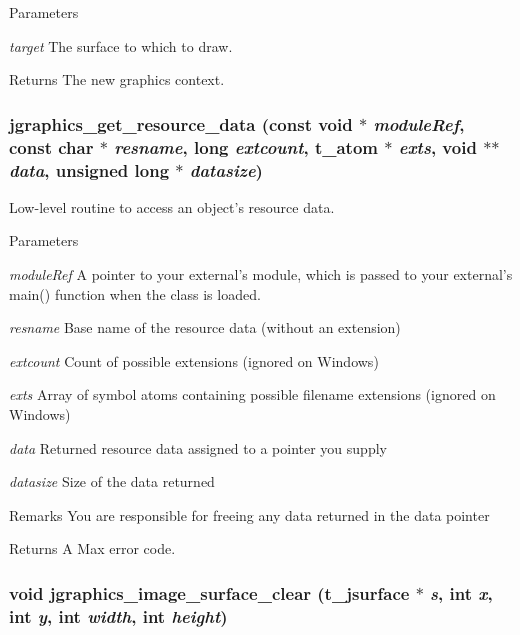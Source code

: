 \begin{DoxyParams}{Parameters}
\item[{\em target}]The surface to which to draw. \end{DoxyParams}
\begin{DoxyReturn}{Returns}
The new graphics context. 
\end{DoxyReturn}
\hypertarget{group__jsurface_gacdc136f6f6a54c8a8a825ba5cb708683}{
\subsubsection[{jgraphics\_\-get\_\-resource\_\-data}]{ jgraphics\_\-get\_\-resource\_\-data (const void $\ast$ {\em moduleRef}, \/  const char $\ast$ {\em resname}, \/  long {\em extcount}, \/  {\bf t\_\-atom} $\ast$ {\em exts}, \/  void $\ast$$\ast$ {\em data}, \/  unsigned long $\ast$ {\em datasize})}}
\label{group__jsurface_gacdc136f6f6a54c8a8a825ba5cb708683}


Low-\/level routine to access an object's resource data. 
\begin{DoxyParams}{Parameters}
\item[{\em moduleRef}]A pointer to your external's module, which is passed to your external's main() function when the class is loaded. \item[{\em resname}]Base name of the resource data (without an extension) \item[{\em extcount}]Count of possible extensions (ignored on Windows) \item[{\em exts}]Array of symbol atoms containing possible filename extensions (ignored on Windows) \item[{\em data}]Returned resource data assigned to a pointer you supply \item[{\em datasize}]Size of the data returned \end{DoxyParams}
\begin{DoxyRemark}{Remarks}
You are responsible for freeing any data returned in the data pointer 
\end{DoxyRemark}
\begin{DoxyReturn}{Returns}
A Max error code. 
\end{DoxyReturn}
\hypertarget{group__jsurface_gafb21797debfc51d220bc448ec2420687}{
\subsubsection[{jgraphics\_\-image\_\-surface\_\-clear}]{\setlength{\rightskip}{0pt plus 5cm}void jgraphics\_\-image\_\-surface\_\-clear ({\bf t\_\-jsurface} $\ast$ {\em s}, \/  int {\em x}, \/  int {\em y}, \/  int {\em width}, \/  int {\em height})}}
\label{group__jsurface_gafb21797debfc51d220bc448ec2420687}


